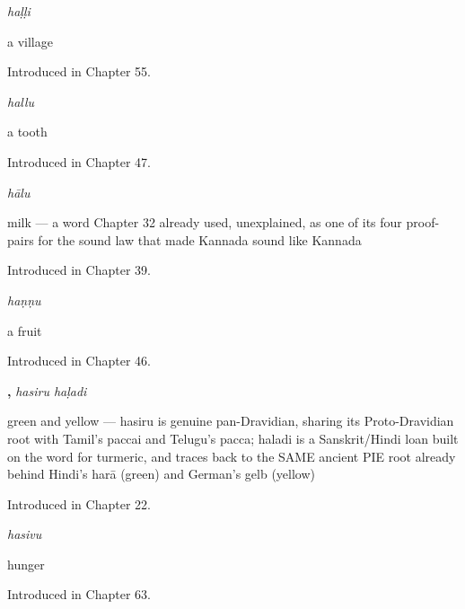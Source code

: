 \noindent\begin{minipage}[t]{\linewidth}
\raggedright
\textbf{}\enspace\emph{haḷḷi}\par
\small a village\par
\footnotesize Introduced in Chapter 55.
\end{minipage}\par\medskip

\noindent\begin{minipage}[t]{\linewidth}
\raggedright
\textbf{}\enspace\emph{hallu}\par
\small a tooth\par
\footnotesize Introduced in Chapter 47.
\end{minipage}\par\medskip

\noindent\begin{minipage}[t]{\linewidth}
\raggedright
\textbf{}\enspace\emph{hālu}\par
\small milk — a word Chapter 32 already used, unexplained, as one of its four proof-pairs for the sound law that made Kannada sound like Kannada\par
\footnotesize Introduced in Chapter 39.
\end{minipage}\par\medskip

\noindent\begin{minipage}[t]{\linewidth}
\raggedright
\textbf{}\enspace\emph{haṇṇu}\par
\small a fruit\par
\footnotesize Introduced in Chapter 46.
\end{minipage}\par\medskip

\noindent\begin{minipage}[t]{\linewidth}
\raggedright
\textbf{, }\enspace\emph{hasiru haḷadi}\par
\small green and yellow — hasiru is genuine pan-Dravidian, sharing its Proto-Dravidian root with Tamil's paccai and Telugu's pacca; haladi is a Sanskrit/Hindi loan built on the word for turmeric, and traces back to the SAME ancient PIE root already behind Hindi's harā (green) and German's gelb (yellow)\par
\footnotesize Introduced in Chapter 22.
\end{minipage}\par\medskip

\noindent\begin{minipage}[t]{\linewidth}
\raggedright
\textbf{}\enspace\emph{hasivu}\par
\small hunger\par
\footnotesize Introduced in Chapter 63.
\end{minipage}\par\medskip

